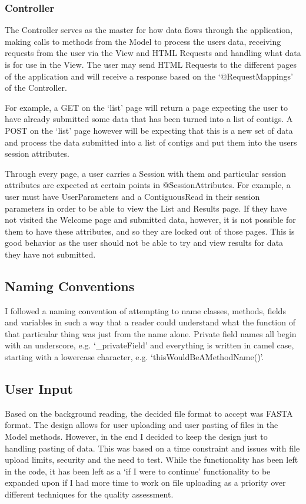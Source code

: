 \subsubsection{Controller}
The Controller serves as the master for how data flows through the application, making calls to methods from the Model to process the users data, receiving requests from the user via the View and HTML Requests and handling what data is for use in the View. The user may send HTML Requests to the different pages of the application and will receive a response based on the `@RequestMappings' of the Controller. 

For example, a GET on the `list' page will return a page expecting the user to have already submitted some data that has been turned into a list of contigs. A POST on the `list' page however will be expecting that this is a new set of data and process the data submitted into a list of contigs and put them into the users session attributes.

Through every page, a user carries a Session with them and particular session attributes are expected at certain points in @SessionAttributes. For example, a user must have UserParameters and a ContiguousRead in their session parameters in order to be able to view the List and Results page. If they have not visited the Welcome page and submitted data, however, it is not possible for them to have these attributes, and so they are locked out of those pages. This is good behavior as the user should not be able to try and view results for data they have not submitted.

\subsection{Naming Conventions}
I followed a naming convention of attempting to name classes, methods, fields and variables in such a way that a reader could understand what the function of that particular thing was just from the name alone. Private field names all begin with an underscore, e.g. `\_privateField' and everything is written in camel case, starting with a lowercase character, e.g. `thisWouldBeAMethodName()'.

\subsection{User Input}
Based on the background reading, the decided file format to accept was FASTA format. The design allows for user uploading and user pasting of files in the Model methods. However, in the end I decided to keep the design just to handling pasting of data. This was based on a time constraint and issues with file upload limits, security and the need to test. While the functionality has been left in the code, it has been left as a `if I were to continue' functionality to be expanded upon if I had more time to work on file uploading as a priority over different techniques for the quality assessment.

